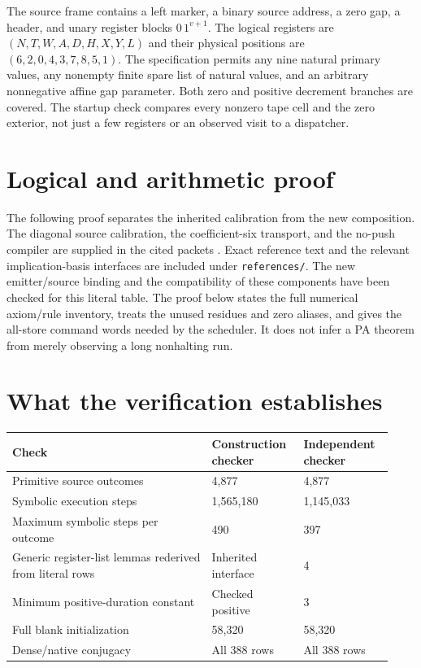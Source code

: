 \documentclass[11pt,letterpaper]{article}
\newcommand{\file}[1]{\texttt{\nolinkurl{#1}}}
\begin{document}
The source frame contains a left marker, a binary source address, a zero
gap, a header, and unary register blocks $0\,1^{v+1}$. The logical registers
are $(N,T,W,A,D,H,X,Y,L)$ and their physical positions are
$(6,2,0,4,3,7,8,5,1)$. The specification permits any nine natural primary
values, any nonempty finite spare list of natural values, and an arbitrary
nonnegative affine gap parameter. Both zero and positive decrement branches
are covered. The startup check compares every nonzero tape cell and the
zero exterior, not just a few registers or an observed visit to a dispatcher.

\section{Logical and arithmetic proof}
\label{sec:proof-intro}

The following proof separates the inherited calibration from the new
composition. The diagonal source calibration, the coefficient-six
transport, and the no-push compiler are supplied in the cited packets
\cite{primary,radix,n6,nq}. Exact reference text and the relevant implication-basis
interfaces are included under \file{references/}. The new emitter/source
binding and the compatibility of these components have been checked for
this literal table. The proof below states the full numerical axiom/rule
inventory, treats the unused residues and zero aliases, and gives the
all-store command words needed by the scheduler. It does not infer a
PA theorem from merely observing a long nonhalting run.



\section{What the verification establishes}
\label{sec:verification}

\begin{longtable}{@{}p{0.49\linewidth}p{0.22\linewidth}p{0.22\linewidth}@{}}
\toprule Check & Construction checker & Independent checker\\\midrule\endhead
Primitive source outcomes &4,877&4,877\\
Symbolic execution steps &1,565,180&1,145,033\\
Maximum symbolic steps per outcome &490&397\\
Generic register-list lemmas rederived from literal rows &Inherited interface&4\\
Minimum positive-duration constant &Checked positive&3\\
Full blank initialization &58,320&58,320\\
Dense/native conjugacy &All 388 rows&All 388 rows\\
\bottomrule
\end{longtable}
\end{document}
